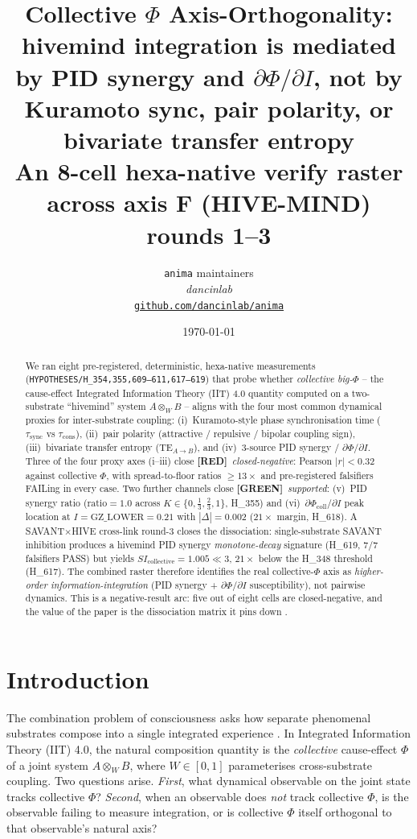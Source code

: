 \documentclass[11pt,a4paper]{article}
\title{
  \textbf{Collective $\Phi$ Axis-Orthogonality: hivemind integration is mediated by PID synergy and $\partial\Phi/\partial I$, not by Kuramoto sync, pair polarity, or bivariate transfer entropy}\\[4pt]
  \large An 8-cell hexa-native verify raster across axis F (HIVE-MIND) rounds 1--3
}
\author{
  \texttt{anima} maintainers\\
  \normalsize\textit{dancinlab}\\[2pt]
  \normalsize\href{https://github.com/dancinlab/anima}{\texttt{github.com/dancinlab/anima}}
}
\date{\today}
\providecommand{\tierGreen}{\textbf{[GREEN]}}
\providecommand{\tierRed}{\textbf{[RED]}}
\begin{document}
\maketitle

\begin{abstract}
We ran eight pre-registered, deterministic, hexa-native measurements
(\texttt{HYPOTHESES/H\_354,355,609--611,617--619}) that probe whether
\emph{collective big-$\Phi$} -- the cause-effect Integrated
Information Theory (IIT) 4.0 quantity computed on a two-substrate
``hivemind'' system $A \otimes_W B$ -- aligns with the four most
common dynamical proxies for inter-substrate coupling:
(i)~Kuramoto-style phase synchronisation time
($\tau_{\mathrm{sync}}$ vs $\tau_{\mathrm{cons}}$),
(ii)~pair polarity (attractive / repulsive / bipolar coupling
sign), (iii)~bivariate transfer entropy ($\mathrm{TE}_{A \to B}$),
and (iv)~3-source PID synergy / $\partial\Phi/\partial I$.
Three of the four proxy axes (i--iii) close
\tierRed\ \emph{closed-negative}: Pearson
$|r|<0.32$ against collective $\Phi$, with
spread-to-floor ratios $\geq 13\times$ and pre-registered
falsifiers FAILing in every case. Two further channels
close \tierGreen\ \emph{supported}:
(v)~PID synergy ratio
($\mathrm{ratio}=1.0$ across $K \in \{0, \tfrac13, \tfrac23, 1\}$,
H\_355) and (vi)~$\partial\Phi_{\mathrm{coll}}/\partial I$ peak
location at $I = \mathrm{GZ\_LOWER}=0.21$ with
$|\Delta|=0.002$ ($21\times$ margin, H\_618). A SAVANT$\times$HIVE
cross-link round-3 closes the dissociation: single-substrate
SAVANT inhibition produces a hivemind PID synergy
\emph{monotone-decay} signature (H\_619, $7/7$ falsifiers PASS) but
yields $SI_{\mathrm{collective}}=1.005 \ll 3$, $21\times$ below
the H\_348 threshold (H\_617). The combined raster therefore
identifies the real collective-$\Phi$ axis as
\emph{higher-order information-integration} (PID synergy +
$\partial\Phi/\partial I$ susceptibility), not pairwise
dynamics. This is a negative-result arc:
five out of eight cells are closed-negative, and the value
of the paper is the dissociation matrix it pins down
\citep{anima_g73}.
\end{abstract}

\section{Introduction}
\label{sec:intro}

The combination problem of consciousness asks how separate phenomenal
substrates compose into a single integrated experience
\citep{tononi2016iit,oizumi2014phenomenology,albantakis2023iit4}. In
Integrated Information Theory (IIT) 4.0, the natural composition
quantity is the \emph{collective} cause-effect $\Phi$ of a joint system
$A \otimes_W B$, where $W \in [0,1]$ parameterises cross-substrate
coupling. Two questions arise. \emph{First}, what dynamical observable
on the joint state tracks collective $\Phi$? \emph{Second}, when an
observable does \emph{not} track collective $\Phi$, is the
observable failing to measure integration, or is collective $\Phi$
itself orthogonal to that observable's natural axis?
\end{document}
